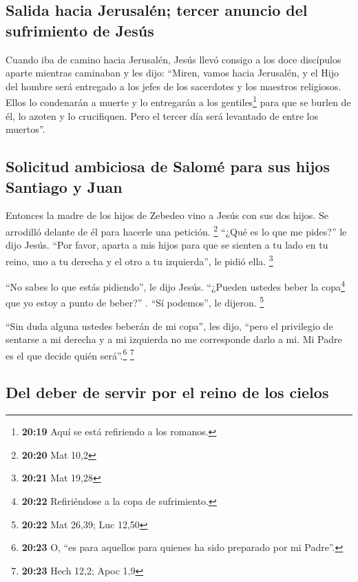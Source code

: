 \hypertarget{salida-hacia-jerusaluxe9n-tercer-anuncio-del-sufrimiento-de-jesuxfas}{%
\subsection{Salida hacia Jerusalén; tercer anuncio del sufrimiento de
Jesús}\label{salida-hacia-jerusaluxe9n-tercer-anuncio-del-sufrimiento-de-jesuxfas}}

 Cuando iba de camino hacia Jerusalén, Jesús llevó
consigo a los doce discípulos aparte mientras caminaban y les dijo:
 ``Miren, vamos hacia Jerusalén, y el Hijo del hombre
será entregado a los jefes de los sacerdotes y los maestros religiosos.
Ellos lo condenarán a muerte  y lo entregarán a los
gentiles\footnote{\textbf{20:19} Aquí se está refiriendo a los romanos.}
para que se burlen de él, lo azoten y lo crucifiquen. Pero el tercer día
será levantado de entre los muertos''.

\hypertarget{solicitud-ambiciosa-de-salomuxe9-para-sus-hijos-santiago-y-juan}{%
\subsection{Solicitud ambiciosa de Salomé para sus hijos Santiago y
Juan}\label{solicitud-ambiciosa-de-salomuxe9-para-sus-hijos-santiago-y-juan}}

 Entonces la madre de los hijos de Zebedeo vino a Jesús
con sus dos hijos. Se arrodilló delante de él para hacerle una petición.
\footnote{\textbf{20:20} Mat 10,2}  ``¿Qué es lo que me
pides?'' le dijo Jesús. ``Por favor, aparta a mis hijos para que se
sienten a tu lado en tu reino, uno a tu derecha y el otro a tu
izquierda'', le pidió ella. \footnote{\textbf{20:21} Mat 19,28}

 ``No sabes lo que estás pidiendo'', le dijo Jesús.
``¿Pueden ustedes beber la copa\footnote{\textbf{20:22} Refiriéndose a
  la copa de sufrimiento.} que yo estoy a punto de beber?'' . ``Sí
podemos'', le dijeron. \footnote{\textbf{20:22} Mat 26,39; Luc 12,50}

 ``Sin duda alguna ustedes beberán de mi copa'', les
dijo, ``pero el privilegio de sentarse a mi derecha y a mi izquierda no
me corresponde darlo a mi. Mi Padre es el que decide quién
será''.\footnote{\textbf{20:23} O, ``es para aquellos para quienes ha
  sido preparado por mi Padre''.} \footnote{\textbf{20:23} Hech 12,2;
  Apoc 1,9}

\hypertarget{del-deber-de-servir-por-el-reino-de-los-cielos}{%
\subsection{Del deber de servir por el reino de los
cielos}\label{del-deber-de-servir-por-el-reino-de-los-cielos}}

